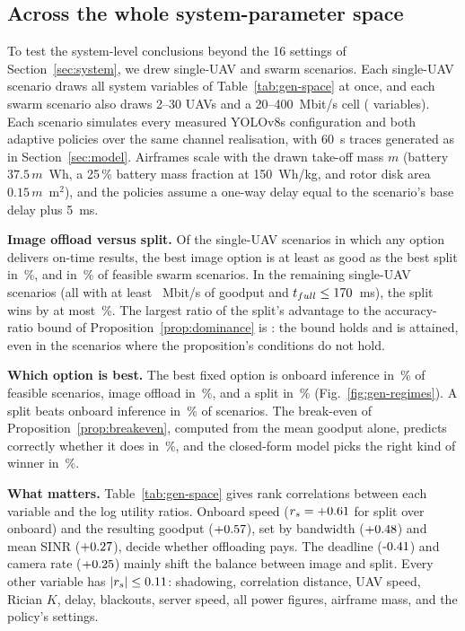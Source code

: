 \documentclass[journal,twocolumn,10pt]{IEEEtran}
\newcommand{\figref}[1]{Fig.~\ref{#1}}
\begin{document}
\subsection{Across the whole system-parameter space}\label{sec:gen-mc}
To test the system-level conclusions beyond the 16 settings of Section~\ref{sec:system}, we drew \GenNScenarios{} single-UAV and \GenNSwarmScenarios{} swarm scenarios. Each single-UAV scenario draws all \GenNVariablesSingle{} system variables of Table~\ref{tab:gen-space} at once, and each swarm scenario also draws 2--30 UAVs and a 20--400~Mbit/s cell (\GenNVariables{} variables). Each scenario simulates every measured YOLOv8s configuration and both adaptive policies over the same channel realisation, with 60~s traces generated as in Section~\ref{sec:model}. Airframes scale with the drawn take-off mass $m$ (battery $37.5\,m$~Wh, a 25\,\% battery mass fraction at 150~Wh/kg, and rotor disk area $0.15\,m$~m$^2$), and the policies assume a one-way delay equal to the scenario's base delay plus 5~ms.

\textbf{Image offload versus split.} Of the \GenFeasible{} single-UAV scenarios in which any option delivers on-time results, the best image option is at least as good as the best split in \GenCodecBeatsSplitPct\,\%, and in \GenSwarmCodecBeatsSplitPct\,\% of feasible swarm scenarios. In the remaining \GenSplitWinsN{} single-UAV scenarios (all with at least \GenSplitWinMinGoodput~Mbit/s of goodput and $t_{full}\le170$~ms), the split wins by at most \GenMaxSplitGainPct\,\%. The largest ratio of the split's advantage to the accuracy-ratio bound of Proposition~\ref{prop:dominance} is \GenBoundRatioMax: the bound holds and is attained, even in the scenarios where the proposition's conditions do not hold.

\textbf{Which option is best.} The best fixed option is onboard inference in \GenOracleOnboardPct\,\% of feasible scenarios, image offload in \GenOracleCodecPct\,\%, and a split in \GenOracleSplitPct\,\% (\figref{fig:gen-regimes}). A split beats onboard inference in \GenSplitBeatsOnboardPct\,\% of scenarios. The break-even of Proposition~\ref{prop:breakeven}, computed from the mean goodput alone, predicts correctly whether it does in \GenBreakEvenAccPct\,\%, and the closed-form model picks the right kind of winner in \GenAnalyticAgreePct\,\%.

\textbf{What matters.} Table~\ref{tab:gen-space} gives rank correlations between each variable and the log utility ratios. Onboard speed ($r_s=+0.61$ for split over onboard) and the resulting goodput ($+0.57$), set by bandwidth ($+0.48$) and mean SINR ($+0.27$), decide whether offloading pays. The deadline ($\GenRhoDeadlineCodec$) and camera rate ($+0.25$) mainly shift the balance between image and split. Every other variable has $|r_s|\le0.11$: shadowing, correlation distance, UAV speed, Rician $K$, delay, blackouts, server speed, all power figures, airframe mass, and the policy's settings.
\end{document}
